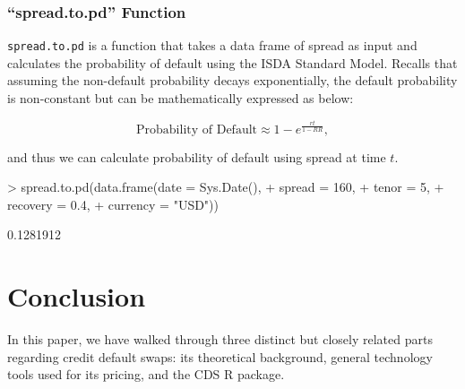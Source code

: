 \documentclass{jss}
\begin{document}
\subsubsection{``spread.to.pd'' Function}

\texttt{spread.to.pd} is a function that takes a data frame of spread as input and calculates the probability of default using the ISDA Standard Model. Recalls that assuming the non-default probability decays exponentially, the default probability is non-constant but can be mathematically expressed as below:
 
\begin{equation}
  \text{Probability of Default} \approx 1 - e ^ {\frac{rt}{1-RR}}, \nonumber
\end{equation}

and thus we can calculate probability of default using spread at time $t$.

\begin{Schunk}
\begin{Sinput}
> spread.to.pd(data.frame(date     = Sys.Date(),
+                         spread   = 160,
+                         tenor    = 5,
+                         recovery = 0.4,
+                         currency = "USD"))
\end{Sinput}
\begin{Soutput}
[1] 0.1281912
\end{Soutput}
\end{Schunk}

\section{Conclusion}


In this paper, we have walked through three distinct but closely related parts regarding credit default swaps: its theoretical background, general technology tools used for its pricing, and the CDS R package.

\end{document}
